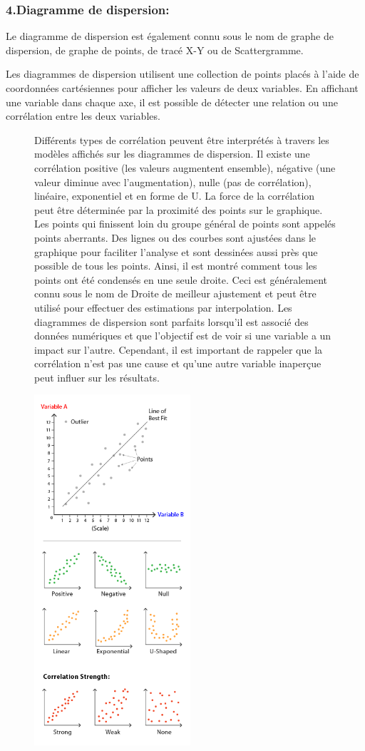\documentclass[french, a4paper, 12pt]{report}
\begin{document}
\subsubsection{4.Diagramme de dispersion:}
Le diagramme de dispersion est également connu sous le nom de graphe de dispersion, de graphe de points, de tracé X-Y ou de Scattergramme.

Les diagrammes de dispersion utilisent une collection de points placés à l'aide de coordonnées cartésiennes pour afficher les valeurs de deux variables. En affichant une variable dans chaque axe, il est possible de détecter une relation ou une corrélation entre les deux variables.
\begin{figure}[!htb]
\begin{minipage}{0.46\linewidth}
Différents types de corrélation peuvent être interprétés à travers les modèles affichés sur les diagrammes de dispersion. Il existe une corrélation positive (les valeurs augmentent ensemble), négative (une valeur diminue avec l’augmentation), nulle (pas de corrélation), linéaire, exponentiel et en forme de U. La force de la corrélation peut être déterminée par la proximité des points sur le graphique. Les points qui finissent loin du groupe général de points sont appelés points aberrants.
Des lignes ou des courbes sont ajustées dans le graphique pour faciliter l'analyse et sont dessinées aussi près que possible de tous les points. Ainsi, il est montré comment tous les points ont été condensés en une seule droite. Ceci est généralement connu sous le nom de Droite de meilleur ajustement et peut être utilisé pour effectuer des estimations par interpolation.
Les diagrammes de dispersion sont parfaits lorsqu’il est associé des données numériques et que l’objectif est de voir si une variable a un impact sur l'autre. Cependant, il est important de rappeler que la corrélation n'est pas une cause et qu'une autre variable inaperçue peut influer sur les résultats.
\end{minipage}\hfil
\begin{minipage}{0.35\linewidth}
    \includegraphics[height=13cm]{images/scatter-plot.png}

\end{minipage}
\end{figure}
\end{document}
